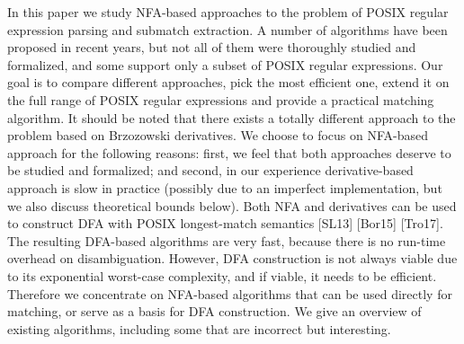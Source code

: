 \documentclass[AMA,STIX1COL]{WileyNJD-v2}
\newcommand{\YN}{\mathbb{N}}
\begin{document}
In this paper we study NFA-based approaches to the problem of POSIX regular expression parsing and submatch extraction.
A number of algorithms have been proposed in recent years,
but not all of them were thoroughly studied and formalized,
and some support only a subset of POSIX regular expressions.
Our goal is to compare different approaches,
pick the most efficient one,
extend it on the full range of POSIX regular expressions
and provide a practical matching algorithm.
%
It should be noted that there exists a totally different approach to the problem based on Brzozowski derivatives.
We choose to focus on NFA-based approach for the following reasons:
first, we feel that both approaches deserve to be studied and formalized;
and second, in our experience derivative-based approach is slow in practice
(possibly due to an imperfect implementation, but we also discuss theoretical bounds below).
%
Both NFA and derivatives can be used to construct DFA with POSIX longest-match semantics [SL13] [Bor15] [Tro17].
The resulting DFA-based algorithms are very fast, because there is no run-time overhead on disambiguation.
However, DFA construction is not always viable due to its exponential worst-case complexity,
and if viable, it needs to be efficient.
Therefore we concentrate on NFA-based algorithms
that can be used directly for matching, or serve as a basis for DFA construction.
We give an overview of existing algorithms, including some that are incorrect but interesting.
%

\end{document}
